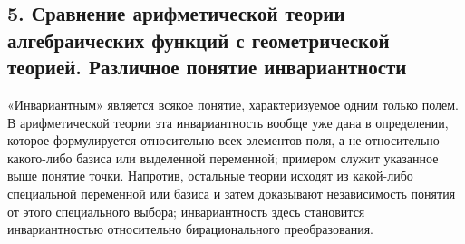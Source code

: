 \documentclass[11pt]{article}
\begin{document}
\subsection*{5. Сравнение арифметической теории алгебраических функций с геометрической теорией. Различное понятие инвариантности}
«Инвариантным» является всякое понятие, характеризуемое одним только полем. В арифметической теории эта инвариантность вообще уже дана в определении, которое формулируется относительно всех элементов поля, а не относительно какого-либо базиса или выделенной переменной; примером служит указанное выше понятие точки. Напротив, остальные теории исходят из какой-либо специальной переменной или базиса и затем доказывают независимость понятия от этого специального выбора; инвариантность здесь становится инвариантностью относительно бирационального преобразования.
\end{document}
